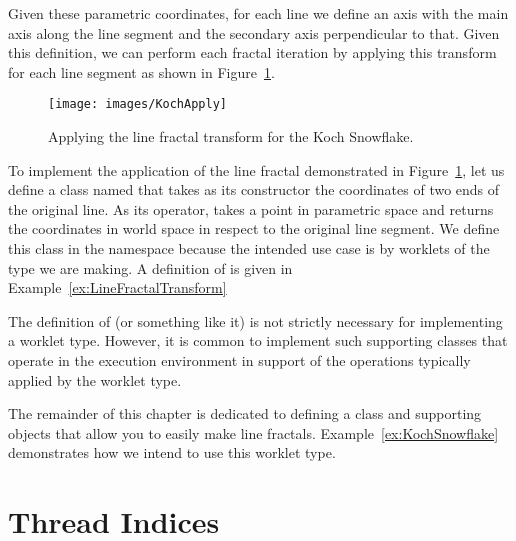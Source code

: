Given these parametric coordinates, for each line we define an axis with the main axis along the line segment and the secondary axis perpendicular to that.
Given this definition, we can perform each fractal iteration by applying this transform for each line segment as shown in Figure~\ref{fig:KochApply}.

\begin{figure}[htb]
  \centering
  \texttt{[image: images/KochApply]}
  \caption{Applying the line fractal transform for the Koch Snowflake.}
  \label{fig:KochApply}
\end{figure}

To implement the application of the line fractal demonstrated in Figure~\ref{fig:KochApply}, let us define a class named  that takes as its constructor the coordinates of two ends of the original line.
As its operator,  takes a point in parametric space and returns the coordinates in world space in respect to the original line segment.
We define this class in the \vtkmexec{} namespace because the intended use case is by worklets of the type we are making.
A definition of  is given in Example~\ref{ex:LineFractalTransform}


\begin{didyouknow}
  The definition of  (or something like it) is not strictly necessary for implementing a worklet type.
  However, it is common to implement such supporting classes that operate in the execution environment in support of the operations typically applied by the worklet type.
\end{didyouknow}

The remainder of this chapter is dedicated to defining a  class and supporting objects that allow you to easily make line fractals.
Example~\ref{ex:KochSnowflake} demonstrates how we intend to use this worklet type.


\section{Thread Indices}
\label{sec:ThreadIndices}

